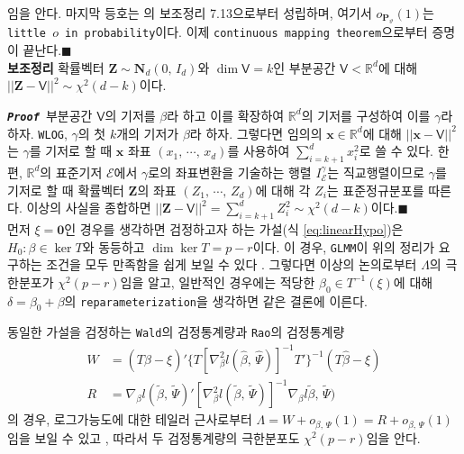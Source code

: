 \documentclass[10pt,onecolumn,twoside,a4size]{gsag3jnl}
\newcommand{\proof}{\texttt{\textit{\textbf{Proof }}}}
\begin{document}
임을 안다. 마지막 등호는 \texttt{\cite{van2000asymptotic}}의 보조정리 7.13으로부터 성립하며, 여기서 $o_{\mathbf{P}_\vartheta}(1)$는 \texttt{little $o$ in probability}이다. 이제 \texttt{continuous mapping theorem}으로부터 증명이 끝난다.\hfill$\blacksquare$\\

\noindent\textsf{\textbf{보조정리} 확률벡터 $\mathbf{Z}\sim\mathbf{N}_d(0,\,I_d)$와 $\dim\mathsf{V}=k$인 부분공간 $\mathsf{V}<\mathbb{R}^d$에 대해 $||\mathbf{Z}-\mathsf{V}||^2\sim\chi^2(d-k)$이다.}

\proof 부분공간 $\mathsf{V}$의 기저를 $\beta$라 하고 이를 확장하여 $\mathbb{R}^d$의 기저를 구성하여 이를 $\gamma$라 하자. \texttt{WLOG}, $\gamma$의 첫 $k$개의 기저가 $\beta$라 하자. 그렇다면 임의의 $\mathbf{x}\in\mathbb{R}^d$에 대해 $||\mathbf{x}-\mathsf{V}||^2$는 $\gamma$를 기저로 할 때 $\mathbf{x}$ 좌표 $(x_1,\,\cdots,\,x_d)$를 사용하여 $\sum_{i=k+1}^dx_i^2$로 쓸 수 있다. 한편, $\mathbb{R}^d$의 표준기저 $\mathcal{E}$에서 $\gamma$로의 좌표변환을 기술하는 행렬 $I_{\mathcal{E}}^{\gamma}$는 직교행렬이므로 $\gamma$를 기저로 할 때 확률벡터 $\mathbf{Z}$의 좌표 $(Z_1,\,\cdots,\,Z_d)$에 대해 각 $Z_i$는 표준정규분포를 따른다. 이상의 사실을 종합하면 $||\mathbf{Z}-\mathsf{V}||^2=\sum_{i=k+1}^dZ_i^2\sim\chi^2(d-k)$이다.\hfill$\blacksquare$\\

먼저 $\xi=\mathbf{0}$인 경우를 생각하면 검정하고자 하는 가설(식 \ref{eq:linearHypo})은 $H_0:\beta\in \ker T$와 동등하고 $\dim\ker T=p-r$이다. 이 경우, \texttt{GLMM}이 위의 정리가 요구하는 조건을 모두 만족함을 쉽게 보일 수 있다 \texttt{\citep{van2000asymptotic}}. 그렇다면 이상의 논의로부터 $\Lambda$의 극한분포가 $\chi^2(p-r)$임을 알고, 일반적인 경우에는 적당한 $\beta_0\in T^{-1}(\xi)$에 대해 $\delta=\beta_0+\beta$의 \texttt{reparameterization}을 생각하면 같은 결론에 이른다.

동일한 가설을 검정하는 \texttt{Wald}의 검정통계량과 \texttt{Rao}의 검정통계량
\begin{align}
  W&=(T\widehat{\beta}-\xi)'\{T[\nabla^2_\beta l(\widehat{\beta},\,\widehat{\Psi})]^{-1}T'\}^{-1}(T\widehat{\beta}-\xi)\\
  R&=\nabla_\beta l(\widetilde{\beta},\,\widetilde{\Psi})'[\nabla^2_\beta l(\widetilde{\beta},\,\widetilde{\Psi})]^{-1}\nabla_\beta l\widetilde{\beta},\,\widetilde{\Psi})
\end{align}
의 경우, 로그가능도에 대한 테일러 근사로부터 $\Lambda=W+o_{\beta,\,\Psi}(1)=R+o_{\beta,\,\Psi}(1)$임을 보일 수 있고 \texttt{\citep{bickel2015mathematical}}, 따라서 두 검정통계량의 극한분포도 $\chi^2(p-r)$임을 안다.
\end{document}
